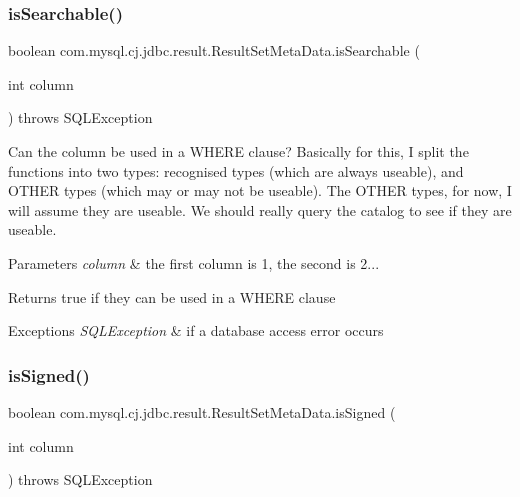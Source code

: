 \subsubsection{\texorpdfstring{is\+Searchable()}{isSearchable()}}
{\footnotesize\ttfamily boolean com.\+mysql.\+cj.\+jdbc.\+result.\+Result\+Set\+Meta\+Data.\+is\+Searchable (\begin{DoxyParamCaption}\item[{int}]{column }\end{DoxyParamCaption}) throws S\+Q\+L\+Exception}

Can the column be used in a W\+H\+E\+RE clause? Basically for this, I split the functions into two types\+: recognised types (which are always useable), and O\+T\+H\+ER types (which may or may not be useable). The O\+T\+H\+ER types, for now, I will assume they are useable. We should really query the catalog to see if they are useable.


\begin{DoxyParams}{Parameters}
{\em column} & the first column is 1, the second is 2...\\
\hline
\end{DoxyParams}
\begin{DoxyReturn}{Returns}
true if they can be used in a W\+H\+E\+RE clause
\end{DoxyReturn}

\begin{DoxyExceptions}{Exceptions}
{\em S\+Q\+L\+Exception} & if a database access error occurs \\
\hline
\end{DoxyExceptions}
\mbox{\label{classcom_1_1mysql_1_1cj_1_1jdbc_1_1result_1_1_result_set_meta_data_af85e5d7b7c03147ed4729bbecb488fd0}} 
\subsubsection{\texorpdfstring{is\+Signed()}{isSigned()}}
{\footnotesize\ttfamily boolean com.\+mysql.\+cj.\+jdbc.\+result.\+Result\+Set\+Meta\+Data.\+is\+Signed (\begin{DoxyParamCaption}\item[{int}]{column }\end{DoxyParamCaption}) throws S\+Q\+L\+Exception}

